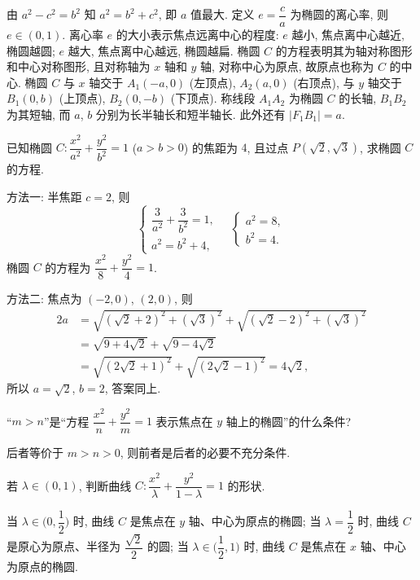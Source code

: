由 $a^2-c^2=b^2$ 知 $a^2=b^2+c^2$, 即 $a$ 值最大. 定义 $e=\dfrac{c}a$ 为椭圆的离心率, 则 $e\in(0,1)$. 离心率 $e$ 的大小表示焦点远离中心的程度: $e$ 越小, 焦点离中心越近, 椭圆越圆; $e$ 越大, 焦点离中心越远, 椭圆越扁. 椭圆 $C$ 的方程表明其为轴对称图形和中心对称图形, 且对称轴为 $x$ 轴和 $y$ 轴, 对称中心为原点, 故原点也称为 $C$ 的中心. 椭圆 $C$ 与 $x$ 轴交于 $A_1(-a,0)$ (左顶点), $A_2(a,0)$ (右顶点), 与 $y$ 轴交于 $B_1(0,b)$ (上顶点), $B_2(0,-b)$ (下顶点). 称线段 $A_1A_2$ 为椭圆 $C$ 的长轴, $B_1B_2$ 为其短轴, 而 $a$, $b$ 分别为长半轴长和短半轴长. 此外还有 $|F_1B_1|=a$.

\lianxi
\begin{exercise}
    已知椭圆 $C\colon \dfrac{x^2}{a^2}+\dfrac{y^2}{b^2}=1$ ($a>b>0$) 的焦距为 $4$, 且过点 $P(\sqrt2,\sqrt3)$, 求椭圆 $C$ 的方程.
\end{exercise}
\beginsolution
    方法一: 半焦距 $c=2$, 则
    \[\left\{\!\!\begin{array}{l}
        \dfrac3{a^2}+ \dfrac3{b^2}= 1,\\
        a^2= b^2+4,
    \end{array}\right.\quad
    \left\{\!\!\begin{array}{l}
        a^2= 8,\\
        b^2= 4.
    \end{array}\right.\]
    椭圆 $C$ 的方程为 $\dfrac{x^2}8+ \dfrac{y^2}4= 1$.

    方法二: 焦点为 $(-2,0)$, $(2,0)$, 则
    \[\begin{aligned}
        2a&= \sqrt{(\sqrt2+2)^2+ (\sqrt3)^2}
            + \sqrt{(\sqrt2-2)^2+ (\sqrt3)^2}\\
        &= \sqrt{9+4\sqrt2}+ \sqrt{9-4\sqrt2}\\
        &= \sqrt{(2\sqrt2+1)^2}+ \sqrt{(2\sqrt2-1)^2}
         = 4\sqrt2,
    \end{aligned}\]
    所以 $a=\sqrt2$, $b=2$, 答案同上.
\endsolution

\begin{exercise}
    “$m>n$”是“方程 $\dfrac{x^2}n +\dfrac{y^2}m =1$ 表示焦点在 $y$ 轴上的椭圆”的什么条件?
\end{exercise}
\beginsolution
    后者等价于 $m>n>0$, 则前者是后者的必要不充分条件.

    \varexercise 若 $\lambda\in (0,1)$, 判断曲线 $C\colon \dfrac{x^2}{\lambda}+ \dfrac{y^2}{1-\lambda}= 1$ 的形状.

    当 $\lambda\in \biggl(0,\dfrac12\biggr)$ 时, 曲线 $C$ 是焦点在 $y$ 轴、中心为原点的椭圆; 当 $\lambda= \dfrac12$ 时, 曲线 $C$ 是原心为原点、半径为 $\dfrac{\sqrt2}2$ 的圆; 当 $\lambda\in \biggl(\dfrac12,1\biggr)$ 时, 曲线 $C$ 是焦点在 $x$ 轴、中心为原点的椭圆.
\endsolution

